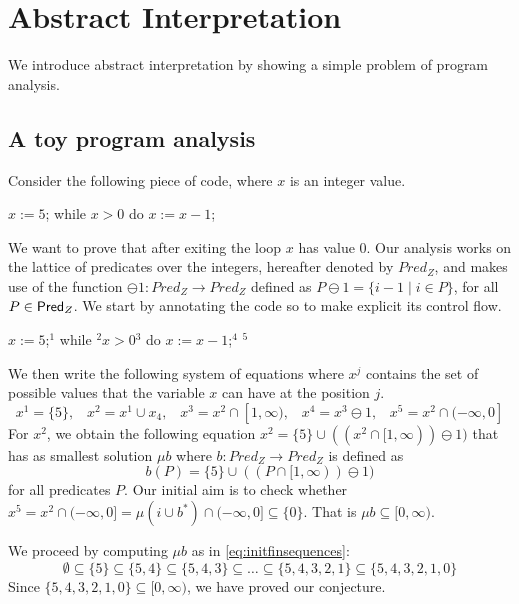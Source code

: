 \documentclass{llncs}
\begin{document}
\section{Abstract Interpretation}
We introduce abstract interpretation by showing a simple problem of program analysis.

\subsection{A toy program analysis}\label{sec:toyprogramanalysis}
Consider the following piece of code, where \texttt{$x$} is an integer value.
\begin{codeNT}
$x := 5$;  while $x>0$ do { $x:=x-1$; }
\end{codeNT}
We want to prove that after exiting the loop \texttt{$x$} has value $0$. Our analysis works on the lattice of predicates over the integers, hereafter denoted by $Pred_Z$, and makes use of the function $\ominus \!1 \colon Pred_Z \to Pred_Z$ defined as $P\ominus \!1 = \{i-1\mid i\in P  \}$, for all $P\in \mathsf{Pred}_Z$. We start by annotating the code so to make explicit its control flow.
\begin{codeNT}
$x := 5$;$^{1}$  while $^{2}$$x>0$$^{3}$ do { $x:=x-1$;$^{4}$ }$^{5}$
\end{codeNT}
We then write the following system of equations where $x^j$ contains the set of possible values that the variable \texttt{$x$} can have at the position $j$.
\begin{equation*}
x^1=\{5\},  \;\;\; x^2 = x^1\cup x_4, \; \; \; x^3 = x^2 \cap [1,\infty), \;\; \; x^4 = x^3 \ominus 1, \; \;\;  x^5 = x^2 \cap (-\infty, 0]
\end{equation*}
For $x^2$, we obtain the following equation
$ x^2 = \{5\} \cup ( (x^2 \cap [1,\infty) ) \ominus \!1 )$ that has as smallest solution $\mu b$ where $b\colon Pred_Z \to Pred_Z$ is defined as 
\begin{equation}\label{eq:babstractInt}
b(P) = \{5\} \cup ( (P\cap [1,\infty) ) \ominus\! 1 )
\end{equation} for all predicates $P$. Our initial aim is to check whether $x^5 = x^2 \cap (-\infty, 0] = \mu (i \cup b^*)\cap (-\infty, 0]  \subseteq \{0\}$. That is $\mu b \subseteq [0,\infty)$. 

We proceed by computing $\mu b$ as in \eqref{eq:initfinsequences}:
\begin{equation}\label{eq:lfpcomp}
\emptyset \subseteq \{5\} \subseteq \{5,4\} \subseteq \{5,4,3\} \subseteq \dots \subseteq \{5,4,3,2,1\} \subseteq \{5,4,3,2,1,0\}
\end{equation}
Since $\{5,4,3,2,1,0\} \subseteq [0,\infty)$, we have proved our conjecture.
\end{document}
